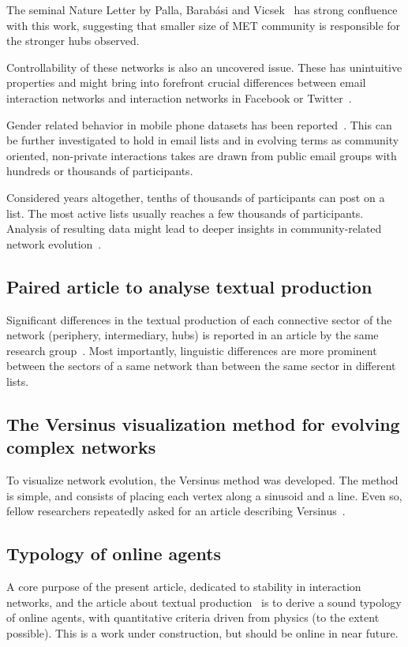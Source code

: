 \documentclass[%
 aip,
 jmp,%
 amsmath,amssymb,
 reprint,%
]{revtex4-1}
\begin{document}
The seminal Nature Letter by Palla, Barab{\'a}si and Vicsek~\cite{barabasiEvo} has strong confluence with this work, suggesting that smaller size of MET community is responsible for the stronger hubs observed.

Controllability of these networks is also an uncovered issue. These has unintuitive properties and might bring into forefront crucial differences between email interaction networks and interaction networks in Facebook or Twitter~\cite{barabasiControlCapacity,barabasiControlCentrality,barabasiControllability}.

Gender related behavior in mobile phone datasets has been reported~\cite{barabasiSex}. This can be further investigated to hold in email lists and in evolving terms as community oriented, non-private interactions takes are drawn from public email groups with hundreds or thousands of participants. 

Considered years altogether, tenths of thousands of participants can post on a list. The most active lists usually reaches a few thousands of participants. Analysis of resulting data might lead to deeper insights in community-related network evolution~\cite{GMANE}.

\subsection{Paired article to analyse textual production}
Significant differences in the textual production of each connective sector of the network (periphery, intermediary, hubs) is reported in an article by the same research group~\cite{rcText}. Most importantly, linguistic differences are more prominent between the sectors of a same network than between the same sector in different lists. 

\subsection{The Versinus visualization method for evolving complex networks}
To visualize network evolution, the Versinus method was developed. The method is simple, and consists of placing each vertex along a sinusoid and a line. Even so, fellow researchers repeatedly asked for an article describing Versinus~\cite{versinus}.

\subsection{Typology of online agents}
A core purpose of the present article, dedicated to stability in interaction networks, and the article about textual production~\cite{rcText} is to derive a sound typology of online agents, with quantitative criteria driven from physics (to the extent possible). This is a work under construction, but should be online in near future.
\end{document}

